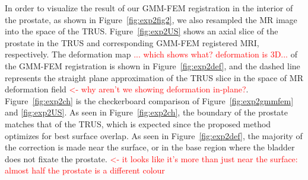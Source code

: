 \documentclass[journal]{IEEEtran}
\newcommand{\comment}[1]{\textcolor{red}{#1}}
\begin{document}
In order to visualize the result of our GMM-FEM registration in the interior of the prostate, as shown in Figure~\ref{fig:exp2fig2}, we also resampled the MR image into the space of the TRUS. Figure~\ref{fig:exp2US} shows an axial slice of the prostate in the TRUS and corresponding GMM-FEM registered MRI, respectively. The deformation map \comment{... which shows what?  deformation is 3D...} of the GMM-FEM registration is shown in Figure~\ref{fig:exp2def}, and the dashed line represents the straight plane approximation of the TRUS slice in the space of MR deformation field \comment{<- why aren't we showing deformation in-plane?}. Figure~\ref{fig:exp2ch} is the checkerboard comparison of Figure~\ref{fig:exp2gmmfem} and \ref{fig:exp2US}. As seen in Figure~\ref{fig:exp2ch}, the boundary of the prostate matches that of the TRUS, which is expected since the proposed method optimizes for best surface overlap. As seen in Figure~\ref{fig:exp2def}, the majority of the correction is made near the surface, or in the base region where the bladder does not fixate the prostate. \comment{<- it looks like it's more than just near the surface: almost half the prostate is a different colour}
\end{document}

